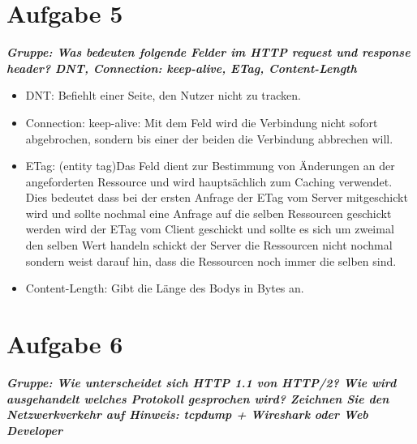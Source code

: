 \documentclass[12pt, a4paper]{report}
\begin{document}
\section*{Aufgabe 5}
\textbf{\textit{Gruppe: Was bedeuten folgende Felder im HTTP request und response header? DNT,
Connection: keep-alive, ETag, Content-Length}}
\begin{itemize}
	\item DNT: Befiehlt einer Seite, den Nutzer nicht zu tracken.
	\item Connection: keep-alive: Mit dem Feld wird die Verbindung nicht sofort abgebrochen, sondern bis einer der beiden die Verbindung abbrechen will.
	\item ETag: (entity tag)Das Feld dient zur Bestimmung von Änderungen an der angeforderten Ressource und wird hauptsächlich zum Caching verwendet. Dies bedeutet dass bei der ersten Anfrage der ETag vom Server mitgeschickt wird und sollte nochmal eine Anfrage auf die selben Ressourcen geschickt werden wird der ETag vom Client geschickt und sollte es sich um zweimal den selben Wert handeln schickt der Server die Ressourcen nicht nochmal sondern weist darauf hin, dass die Ressourcen noch immer die selben sind.
	\item Content-Length: Gibt die Länge des Bodys in Bytes an.
\end{itemize}

\section*{Aufgabe 6}
\textbf{\textit{Gruppe: Wie unterscheidet sich HTTP 1.1 von HTTP/2? Wie wird ausgehandelt welches
Protokoll gesprochen wird? Zeichnen Sie den Netzwerkverkehr auf Hinweis: tcpdump +
Wireshark oder Web Developer}}
\end{document}
